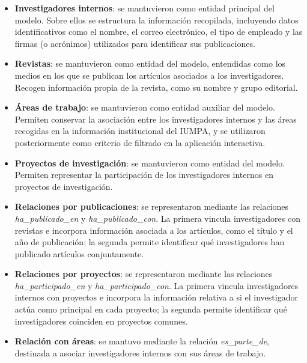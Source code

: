 \documentclass[11pt,spanish,listoffigures,listoftables]{tfgetsinf}
\begin{document}
\begin{itemize}
    \item \textbf{Investigadores internos}: se mantuvieron como entidad principal del modelo. Sobre ellos se estructura la información recopilada, incluyendo datos identificativos como el nombre, el correo electrónico, el tipo de empleado y las firmas (o acrónimos) utilizados para identificar sus publicaciones.

    \item \textbf{Revistas}: se mantuvieron como entidad del modelo, entendidas como los medios en los que se publican los artículos asociados a los investigadores. Recogen información propia de la revista, como su nombre y grupo editorial.

    \item \textbf{Áreas de trabajo}: se mantuvieron como entidad auxiliar del modelo. Permiten conservar la asociación entre los investigadores internos y las áreas recogidas en la información institucional del IUMPA, y se utilizaron posteriormente como criterio de filtrado en la aplicación interactiva.

    \item \textbf{Proyectos de investigación}: se mantuvieron como entidad del modelo. Permiten representar la participación de los investigadores internos en proyectos de investigación.

    \item \textbf{Relaciones por publicaciones}: se representaron mediante las relaciones \textit{ha\_publicado\_en} y \textit{ha\_publicado\_con}. La primera vincula investigadores con revistas e incorpora información asociada a los artículos, como el título y el año de publicación; la segunda permite identificar qué investigadores han publicado artículos conjuntamente.

    \item \textbf{Relaciones por proyectos}: se representaron mediante las relaciones \textit{ha\_participado\_en} y \textit{ha\_participado\_con}. La primera vincula investigadores internos con proyectos e incorpora la información relativa a si el investigador actúa como principal en cada proyecto; la segunda permite identificar qué investigadores coinciden en proyectos comunes.

    \item \textbf{Relación con áreas}: se mantuvo mediante la relación \textit{es\_parte\_de}, destinada a asociar investigadores internos con sus áreas de trabajo.
\end{itemize}
\end{document}
